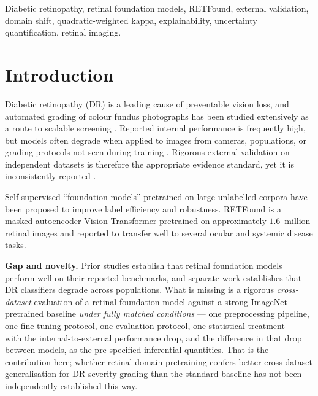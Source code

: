 \documentclass[journal]{IEEEtran}
\begin{document}
\begin{IEEEkeywords}
Diabetic retinopathy, retinal foundation models, RETFound, external validation,
domain shift, quadratic-weighted kappa, explainability, uncertainty
quantification, retinal imaging.
\end{IEEEkeywords}

\IEEEpeerreviewmaketitle


\section{Introduction}
\label{sec:intro}

Diabetic retinopathy (DR) is a leading cause of preventable vision loss, and
automated grading of colour fundus photographs has been studied extensively as a
route to scalable screening \cite{gulshan2016,ting2017}. Reported internal
performance is frequently high, but models often degrade when applied to images
from cameras, populations, or grading protocols not seen during training
\cite{beede2020,dai2021spectrum}. Rigorous external validation on independent
datasets is therefore the appropriate evidence standard, yet it is inconsistently
reported \cite{grzybowski2020review,tripodai2024}.

Self-supervised ``foundation models'' pretrained on large unlabelled corpora have
been proposed to improve label efficiency and robustness. RETFound
\cite{zhou2023retfound} is a masked-autoencoder \cite{he2022mae} Vision
Transformer \cite{dosovitskiy2021vit} pretrained on approximately $1.6$~million
retinal images and reported to transfer well to several ocular and systemic
disease tasks.

\textbf{Gap and novelty.} Prior studies establish that retinal foundation models
perform well on their reported benchmarks, and separate work establishes that
DR classifiers degrade across populations. What is missing is a rigorous
\emph{cross-dataset} evaluation of a retinal foundation model against a strong
ImageNet-pretrained baseline \emph{under fully matched conditions} --- one
preprocessing pipeline, one fine-tuning protocol, one evaluation protocol, one
statistical treatment --- with the internal-to-external performance drop, and the
difference in that drop between models, as the pre-specified inferential
quantities. That is the contribution here; whether retinal-domain pretraining
confers better cross-dataset generalisation for DR severity grading than the
standard baseline has not been independently established this way.
\end{document}
